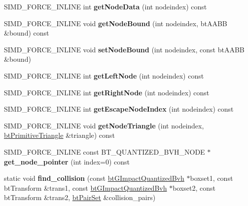 \begin{DoxyCompactItemize}
\mbox{\label{classbtGImpactQuantizedBvh_a12132949eefa86c915a05fe096971bb7}} 
S\+I\+M\+D\+\_\+\+F\+O\+R\+C\+E\+\_\+\+I\+N\+L\+I\+NE int {\bfseries get\+Node\+Data} (int nodeindex) const
\item 
\mbox{\label{classbtGImpactQuantizedBvh_af2580802ef1615c666dc16591bde980e}} 
S\+I\+M\+D\+\_\+\+F\+O\+R\+C\+E\+\_\+\+I\+N\+L\+I\+NE void {\bfseries get\+Node\+Bound} (int nodeindex, bt\+A\+A\+BB \&bound) const
\item 
\mbox{\label{classbtGImpactQuantizedBvh_ad5ce839e5417a84899a177197dac9bca}} 
S\+I\+M\+D\+\_\+\+F\+O\+R\+C\+E\+\_\+\+I\+N\+L\+I\+NE void {\bfseries set\+Node\+Bound} (int nodeindex, const bt\+A\+A\+BB \&bound)
\item 
\mbox{\label{classbtGImpactQuantizedBvh_ac23d86ca78e016ea10d998c0a86c9202}} 
S\+I\+M\+D\+\_\+\+F\+O\+R\+C\+E\+\_\+\+I\+N\+L\+I\+NE int {\bfseries get\+Left\+Node} (int nodeindex) const
\item 
\mbox{\label{classbtGImpactQuantizedBvh_a49400a16e5652be1e69009733ad9acc3}} 
S\+I\+M\+D\+\_\+\+F\+O\+R\+C\+E\+\_\+\+I\+N\+L\+I\+NE int {\bfseries get\+Right\+Node} (int nodeindex) const
\item 
\mbox{\label{classbtGImpactQuantizedBvh_ade06323022f1de1d12f19de1f1ef190d}} 
S\+I\+M\+D\+\_\+\+F\+O\+R\+C\+E\+\_\+\+I\+N\+L\+I\+NE int {\bfseries get\+Escape\+Node\+Index} (int nodeindex) const
\item 
\mbox{\label{classbtGImpactQuantizedBvh_a0b01e04d70aeec6ce570958c8fb2ce68}} 
S\+I\+M\+D\+\_\+\+F\+O\+R\+C\+E\+\_\+\+I\+N\+L\+I\+NE void {\bfseries get\+Node\+Triangle} (int nodeindex, \hyperlink{classbtPrimitiveTriangle}{bt\+Primitive\+Triangle} \&triangle) const
\item 
\mbox{\label{classbtGImpactQuantizedBvh_a8e21bbe54a9fd1482ce3bd7f88162dda}} 
S\+I\+M\+D\+\_\+\+F\+O\+R\+C\+E\+\_\+\+I\+N\+L\+I\+NE const B\+T\+\_\+\+Q\+U\+A\+N\+T\+I\+Z\+E\+D\+\_\+\+B\+V\+H\+\_\+\+N\+O\+DE $\ast$ {\bfseries get\+\_\+node\+\_\+pointer} (int index=0) const
\item 
\mbox{\label{classbtGImpactQuantizedBvh_af935ccd4fb414c6d5ae1f15209395193}} 
static void {\bfseries find\+\_\+collision} (const \hyperlink{classbtGImpactQuantizedBvh}{bt\+G\+Impact\+Quantized\+Bvh} $\ast$boxset1, const bt\+Transform \&trans1, const \hyperlink{classbtGImpactQuantizedBvh}{bt\+G\+Impact\+Quantized\+Bvh} $\ast$boxset2, const bt\+Transform \&trans2, \hyperlink{classbtPairSet}{bt\+Pair\+Set} \&collision\+\_\+pairs)
\end{DoxyCompactItemize}
